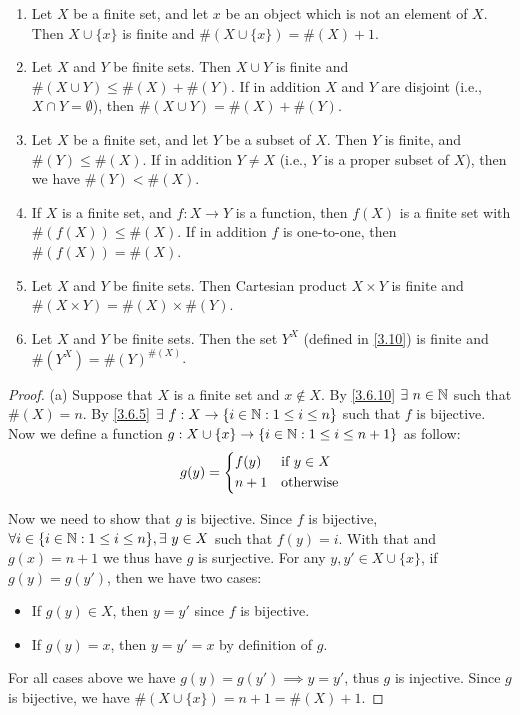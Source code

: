 \begin{prop}\label{3.6.14}
  \leavevmode
  \begin{enumerate}
    \item Let \(X\) be a finite set, and let \(x\) be an object which is not an element of \(X\).
          Then \(X \cup \{x\}\) is finite and \(\#(X \cup \{x\}) = \#(X) + 1\).
    \item Let \(X\) and \(Y\) be finite sets.
          Then \(X \cup Y\) is finite and \(\#(X \cup Y) \leq \#(X) + \#(Y)\).
          If in addition \(X\) and \(Y\) are disjoint (i.e., \(X \cap Y = \emptyset\)), then \(\#(X \cup Y) = \#(X) + \#(Y)\).
    \item Let \(X\) be a finite set, and let \(Y\) be a subset of \(X\).
          Then \(Y\) is finite, and \(\#(Y) \leq \#(X)\).
          If in addition \(Y \neq X\) (i.e., \(Y\) is a proper subset of \(X\)), then we have \(\#(Y) < \#(X)\).
    \item If \(X\) is a finite set, and \(f : X \to Y\) is a function, then \(f(X)\) is a finite set with \(\#(f(X)) \leq \#(X)\).
          If in addition \(f\) is one-to-one, then \(\#(f(X)) = \#(X)\).
    \item Let \(X\) and \(Y\) be finite sets.
          Then Cartesian product \(X \times Y\) is finite and \(\#(X \times Y) = \#(X) \times \#(Y)\).
    \item Let \(X\) and \(Y\) be finite sets.
          Then the set \(Y^X\) (defined in \cref{3.10}) is finite and \(\#(Y^X) = \#(Y)^{\#(X)}\).
  \end{enumerate}
\end{prop}

\begin{proof}{(a)}
  Suppose that \(X\) is a finite set and \(x \notin X\).
  By \cref{3.6.10} \(\exists\ n \in \N\) such that \(\#(X) = n\).
  By \cref{3.6.5} \(\exists\ f : X \to \{i \in \mathbb{N} : 1 \leq i \leq n\}\) such that \(f\) is bijective.
  Now we define a function \(g : X \cup \{x\} \to \{i \in \mathbb{N} : 1 \leq i \leq n + 1\}\) as follow:
  \[
    g(y) = \begin{dcases}
      f(y)  & \text{if } y \in X \\
      n + 1 & \text{otherwise}
    \end{dcases}
  \]

  Now we need to show that \(g\) is bijective.
  Since \(f\) is bijective, \(\forall i \in \{i \in \mathbb{N} : 1 \leq i \leq n\}, \exists\ y \in X\) such that \(f(y) = i\).
  With that and \(g(x) = n + 1\) we thus have \(g\) is surjective.
  For any \(y, y' \in X \cup \{x\}\), if \(g(y) = g(y')\), then we have two cases:
  \begin{itemize}
    \item If \(g(y) \in X\), then \(y = y'\) since \(f\) is bijective.
    \item If \(g(y) = x\), then \(y = y' = x\) by definition of \(g\).
  \end{itemize}
  For all cases above we have \(g(y) = g(y') \implies y = y'\), thus \(g\) is injective.
  Since \(g\) is bijective, we have \(\#(X \cup \{x\}) = n + 1 = \#(X) + 1\).
\end{proof}

